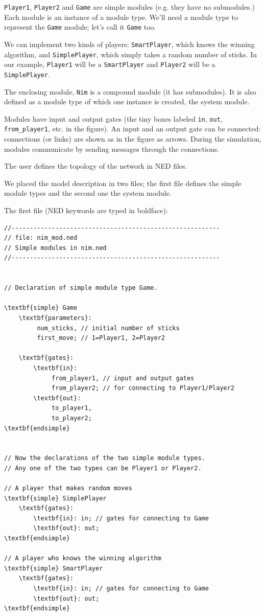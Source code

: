 \texttt{Player1}, \texttt{Player2} and \texttt{Game} are simple
modules (e.g. they have no submodules.) Each module is an instance of
a module type. We'll need a module type to represent the \texttt{Game} module;
let's call it \texttt{Game} too.

We can implement two kinds of players: \texttt{SmartPlayer}, which knows 
the winning algorithm, and \texttt{SimplePlayer}, which simply takes a 
random number of sticks. In our example, \texttt{Player1} will be a \texttt{SmartPlayer} 
and \texttt{Player2} will be a \texttt{SimplePlayer}.

The enclosing module, \texttt{Nim} is a compound module (it has submodules). 
It is also defined as a module type of which one instance is 
created, the system module.

Modules have input and output gates (the tiny boxes
labeled \texttt{in}, \texttt{out}, \texttt{from\_player1}, etc. in the
figure). An input and an output gate can be connected: connections (or
links) are shown as in the figure as arrows.  During the simulation,
modules communicate by sending messages through the connections.


The user defines the topology of the network in NED files.


We placed the model description in two files; the first file 
defines the simple module types and the second one the system 
module.

The first file (NED keywords are typed in boldface):

\begin{Verbatim}[commandchars=\\\{\}]
//---------------------------------------------------------
// file: nim_mod.ned
// Simple modules in nim.ned
//---------------------------------------------------------


// Declaration of simple module type Game.

\textbf{simple} Game
    \textbf{parameters}:
         num_sticks, // initial number of sticks
         first_move; // 1=Player1, 2=Player2

    \textbf{gates}:
        \textbf{in}:
             from_player1, // input and output gates
             from_player2; // for connecting to Player1/Player2
        \textbf{out}:
             to_player1,
             to_player2;
\textbf{endsimple}


// Now the declarations of the two simple module types.
// Any one of the two types can be Player1 or Player2.

// A player that makes random moves
\textbf{simple} SimplePlayer
    \textbf{gates}:
        \textbf{in}: in; // gates for connecting to Game
        \textbf{out}: out;
\textbf{endsimple}

// A player who knows the winning algorithm
\textbf{simple} SmartPlayer
    \textbf{gates}:
        \textbf{in}: in; // gates for connecting to Game
        \textbf{out}: out;
\textbf{endsimple}
\end{Verbatim}


